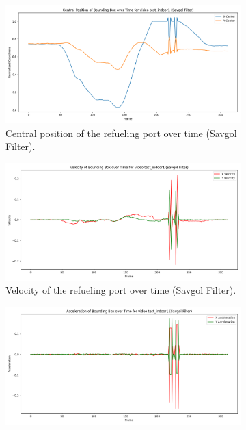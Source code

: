 \documentclass[12pt,oneside]{book} %
\begin{document}
\begin{figure}[H]
    \centering
    \begin{subfigure}[t]{0.45\textwidth}
        \includegraphics[width=\textwidth]{figures/bbox_metrics/test_indoor1 (Savgol Filter)_central_position.png}
        \caption{Central position of the refueling port over time (Savgol Filter).}
        \label{fig:central-position-test-indoor1-savgol}
    \end{subfigure}
    \hfill
    \begin{subfigure}[t]{0.45\textwidth}
        \includegraphics[width=\textwidth]{figures/bbox_metrics/test_indoor1 (Savgol Filter)_velocity.png}
        \caption{Velocity of the refueling port over time (Savgol Filter).}
        \label{fig:velocity-test-indoor1-savgol}
    \end{subfigure}
    \vfill
    \begin{subfigure}[t]{0.45\textwidth}
        \includegraphics[width=\textwidth]{figures/bbox_metrics/test_indoor1 (Savgol Filter)_acceleration.png}

\end{subfigure}
\end{figure}
\end{document}
